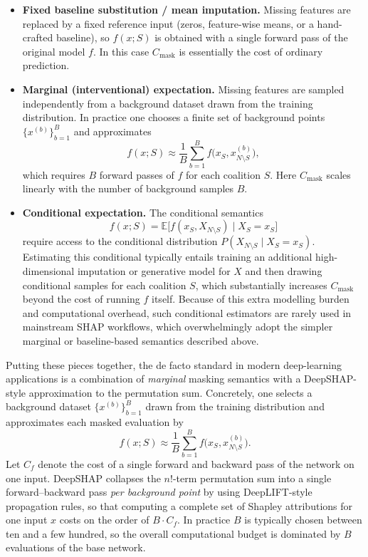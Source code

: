 \documentclass{article}
\begin{document}
\begin{itemize}
  \item \textbf{Fixed baseline substitution / mean imputation.}
  Missing features are replaced by a fixed reference input (zeros, feature-wise means, or a hand-crafted baseline), so $f(x; S)$ is obtained with a single forward pass of the original model $f$.
  In this case $C_{\text{mask}}$ is essentially the cost of ordinary prediction.

  \item \textbf{Marginal (interventional) expectation.}
  Missing features are sampled independently from a background dataset drawn from the training distribution.
  In practice one chooses a finite set of background points $\{x^{(b)}\}_{b=1}^B$ and approximates
  \[
  f(x; S)
  \approx \frac{1}{B} \sum_{b=1}^B f\bigl(x_S, x^{(b)}_{N \setminus S}\bigr),
  \]
  which requires $B$ forward passes of $f$ for each coalition $S$.
  Here $C_{\text{mask}}$ scales linearly with the number of background samples $B$.

  \item \textbf{Conditional expectation.}
  The conditional semantics
  \[
  f(x; S)
  = \mathbb{E}\bigl[f(x_S, X_{N \setminus S}) \mid X_S = x_S\bigr]
  \]
  require access to the conditional distribution $P(X_{N \setminus S} \mid X_S = x_S)$.
  Estimating this conditional typically entails training an additional high-dimensional imputation or generative model for $X$ and then drawing conditional samples for each coalition $S$, which substantially increases $C_{\text{mask}}$ beyond the cost of running $f$ itself.
  Because of this extra modelling burden and computational overhead, such conditional estimators are rarely used in mainstream SHAP workflows, which overwhelmingly adopt the simpler marginal or baseline-based semantics described above.
\end{itemize}

Putting these pieces together, the de facto standard in modern deep-learning applications is a combination of \emph{marginal} masking semantics with a DeepSHAP-style approximation to the permutation sum. Concretely, one selects a background dataset $\{x^{(b)}\}_{b=1}^B$ drawn from the training distribution and approximates each masked evaluation by
\[
f(x; S)
\approx \frac{1}{B} \sum_{b=1}^B f\bigl(x_S, x^{(b)}_{N \setminus S}\bigr).
\]
Let $C_f$ denote the cost of a single forward and backward pass of the network on one input. DeepSHAP collapses the $n!$-term permutation sum into a single forward–backward pass \emph{per background point} by using DeepLIFT-style propagation rules, so that computing a complete set of Shapley attributions for one input $x$ costs on the order of $B \cdot C_f$. In practice $B$ is typically chosen between ten and a few hundred, so the overall computational budget is dominated by $B$ evaluations of the base network.
\end{document}

